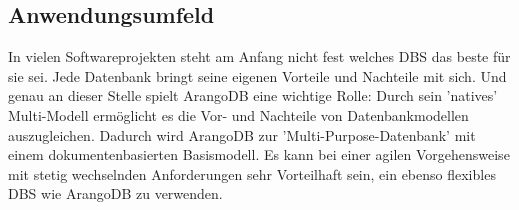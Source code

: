 \subsection{Anwendungsumfeld}
In vielen Softwareprojekten steht am Anfang nicht fest welches \ac{DBS} das beste für sie sei. Jede Datenbank bringt seine eigenen Vorteile und Nachteile mit sich. Und genau an dieser Stelle spielt ArangoDB eine wichtige Rolle:
Durch sein ’natives’ Multi-Modell ermöglicht es die Vor- und Nachteile von Datenbankmodellen auszugleichen. Dadurch wird ArangoDB zur ’Multi-Purpose-Datenbank’ mit einem dokumentenbasierten Basismodell\cite{jaxenter01}. Es kann bei einer agilen Vorgehensweise mit stetig wechselnden Anforderungen sehr Vorteilhaft sein, ein ebenso flexibles DBS wie ArangoDB zu verwenden.
